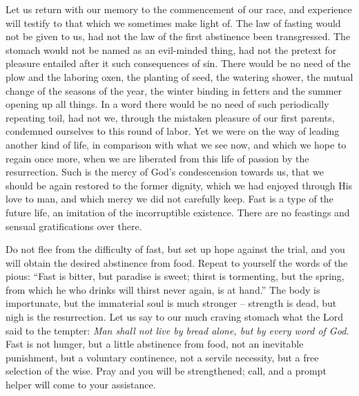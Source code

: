 Let us return with our memory to the commencement
of our race, and experience will 
testify to that which we sometimes make light 
of. The law of fasting would not be given to 
us, had not the law of the first abstinence been 
transgressed. The stomach would not be 
named as an evil-minded thing, had not the 
pretext for pleasure entailed after it such consequences
of sin. There would be no need of 
the plow and the laboring oxen, the planting of 
seed, the watering shower, the mutual change of 
the seasons of the year, the winter binding in 
fetters and the summer opening up all things. 
In a word there would be no need of such 
periodically repeating toil, had not we, through 
the mistaken pleasure of our first parents, condemned
ourselves to this round of labor. Yet 
we were on the way of leading another kind 
of life, in comparison with what we see now, 
and which we hope to regain once more, when 
we are liberated from this life of passion by 
the resurrection. Such is the mercy of God's 
condescension towards us, that we should be
again restored to the former dignity, which we 
had enjoyed through His love to man, and 
which mercy we did not carefully keep. Fast 
is a type of the future life, an imitation of the 
incorruptible existence. There are no feastings
and sensual gratifications over there. 

Do not flee from the difficulty of fast, but set 
up hope against the trial, and you will obtain 
the desired abstinence from food. Repeat to 
yourself the words of the pious: ``Fast is 
bitter, but paradise is sweet; thirst is tormenting,
but the spring, from which he who drinks 
will thirst never again, is at hand.'' The body 
is importunate, but the immaterial soul is 
much stronger -- strength is dead, but nigh is 
the resurrection. Let us say to our much craving
stomach what the Lord said to the tempter: 
\textit{Man shall not live by bread alone, but by every 
word of God}. Fast is not hunger, but a little 
abstinence from food, not an inevitable punishment,
but a voluntary continence, not a servile 
necessity, but a free selection of the wise. 
Pray and you will be strengthened; call, and a 
prompt helper will come to your assistance.
